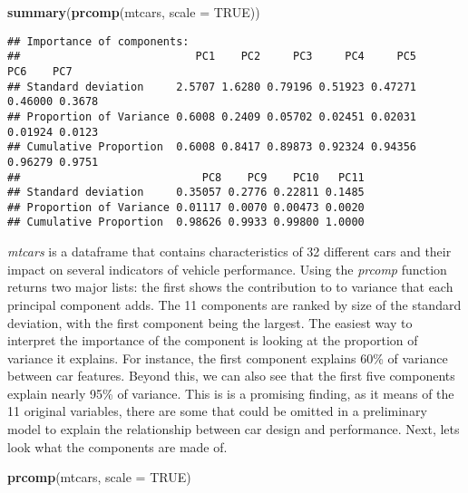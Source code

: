 \documentclass[
]{article}
\newenvironment{Shaded}{\begin{snugshade}}{\end{snugshade}}
\newcommand{\DataTypeTok}[1]{\textcolor[rgb]{0.13,0.29,0.53}{#1}}
\newcommand{\KeywordTok}[1]{\textcolor[rgb]{0.13,0.29,0.53}{\textbf{#1}}}
\newcommand{\NormalTok}[1]{#1}
\newcommand{\OtherTok}[1]{\textcolor[rgb]{0.56,0.35,0.01}{#1}}
\begin{document}
\begin{Shaded}
\begin{Highlighting}[]
\KeywordTok{summary}\NormalTok{(}\KeywordTok{prcomp}\NormalTok{(mtcars, }\DataTypeTok{scale =} \OtherTok{TRUE}\NormalTok{))}
\end{Highlighting}
\end{Shaded}

\begin{verbatim}
## Importance of components:
##                           PC1    PC2     PC3     PC4     PC5     PC6    PC7
## Standard deviation     2.5707 1.6280 0.79196 0.51923 0.47271 0.46000 0.3678
## Proportion of Variance 0.6008 0.2409 0.05702 0.02451 0.02031 0.01924 0.0123
## Cumulative Proportion  0.6008 0.8417 0.89873 0.92324 0.94356 0.96279 0.9751
##                            PC8    PC9    PC10   PC11
## Standard deviation     0.35057 0.2776 0.22811 0.1485
## Proportion of Variance 0.01117 0.0070 0.00473 0.0020
## Cumulative Proportion  0.98626 0.9933 0.99800 1.0000
\end{verbatim}

\emph{mtcars} is a dataframe that contains characteristics of 32
different cars and their impact on several indicators of vehicle
performance. Using the \emph{prcomp} function returns two major lists:
the first shows the contribution to to variance that each principal
component adds. The 11 components are ranked by size of the standard
deviation, with the first component being the largest. The easiest way
to interpret the importance of the component is looking at the
proportion of variance it explains. For instance, the first component
explains 60\% of variance between car features. Beyond this, we can also
see that the first five components explain nearly 95\% of variance. This
is is a promising finding, as it means of the 11 original variables,
there are some that could be omitted in a preliminary model to explain
the relationship between car design and performance. Next, lets look
what the components are made of.

\begin{Shaded}
\begin{Highlighting}[]
\KeywordTok{prcomp}\NormalTok{(mtcars, }\DataTypeTok{scale =} \OtherTok{TRUE}\NormalTok{)}
\end{Highlighting}
\end{Shaded}
\end{document}
